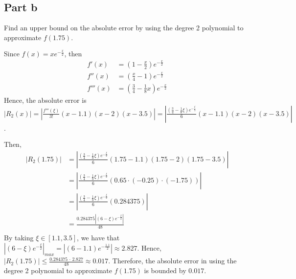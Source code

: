 \subsection{Part b}

\begin{question}
    Find an upper bound on the absolute error by using the degree 2 polynomial to approximate $f(1.75)$.
\end{question}

\begin{answer}
    Since $f(x) = xe^{-\tfrac{x}{2}}$, then 
    \begin{align}
        f'(x) &= (1-\tfrac{x}{2})e^{-\tfrac{x}{2}}\\
        f''(x) &= (\tfrac{x}{4} - 1)e^{-\tfrac{x}{2}}\\
        f'''(x) &= (\tfrac{3}{4} - \tfrac{1}{8}x)e^{-\tfrac{x}{2}}
    \end{align}
    Hence, the absolute error is $\vert R_2(x) \rvert = \left\lvert\tfrac{f'''(\xi)}{3!}(x-1.1)(x-2)(x-3.5)\right\rvert = \left\lvert\tfrac{(\tfrac{3}{4} - \tfrac{1}{8}\xi)e^{-\tfrac{\xi}{2}}}{6}(x-1.1)(x-2)(x-3.5)\right\rvert$.
    
    Then,
    \begin{align}
        \lvert R_2(1.75)\rvert &= \left\lvert\tfrac{(\tfrac{3}{4} - \tfrac{1}{8}\xi)e^{-\tfrac{\xi}{2}}}{6}(1.75-1.1)(1.75-2)(1.75-3.5)\right\rvert\\
        &= \left\lvert\tfrac{(\tfrac{3}{4} - \tfrac{1}{8}\xi)e^{-\tfrac{\xi}{2}}}{6}(0.65\cdot(-0.25)\cdot(-1.75))\right\rvert\\
        &= \left\lvert\tfrac{(\tfrac{3}{4} - \tfrac{1}{8}\xi)e^{-\tfrac{\xi}{2}}}{6}(0.284375)\right\rvert\\
        &= \tfrac{0.284375\left\lvert(6-\xi)e^{-\tfrac{\xi}{2}}\right\rvert}{48}\\
    \end{align}
    By taking $\xi \in [1.1,3.5]$, we have that ${\left\lvert(6-\xi)e^{-\tfrac{\xi}{2}}\right\rvert}_{max} = \left\lvert(6-1.1)e^{-\tfrac{1.1}{2}}\right\rvert \approx 2.827$.
    Hence, $\lvert R_2(1.75)\rvert \leq \tfrac{0.284375\,\cdot\,2.827}{48} \approx 0.017$. Therefore, the absolute error in using the degree 2 polynomial to approximate $f(1.75)$ is bounded by $0.017$.
\end{answer}